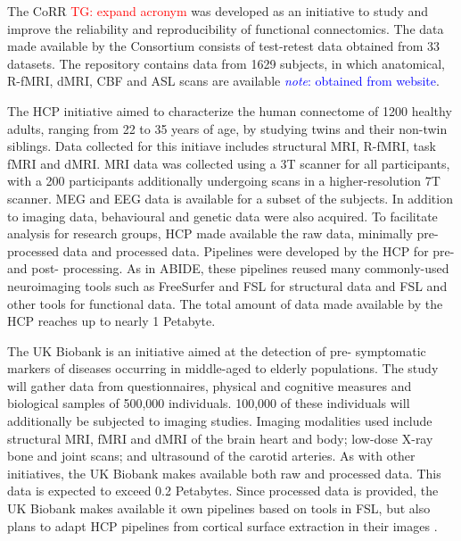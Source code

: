 \documentclass{report}
\newcommand{\note}[1]{\textcolor{blue}{\textit{note}: #1}}
\newcommand{\tristan}[1]{\textcolor{red}{TG: #1}}
\begin{document}
            The CoRR \tristan{expand acronym} was developed as an initiative to study and improve the 
            reliability and reproducibility of functional connectomics. The 
            data made available by the Consortium consists of test-retest data 
            obtained from 33 datasets. The repository contains data from 1629 
            subjects, in which anatomical, R-fMRI, dMRI, CBF and ASL scans are 
            available \note{obtained from website}.


            The HCP initiative aimed to characterize the human connectome of 
            1200 healthy adults, ranging from 22 to 35 years of age, by studying
            twins and their non-twin siblings. Data collected for this initiave
            includes structural MRI, R-fMRI, task fMRI and dMRI. MRI data was
            collected using a 3T scanner for all participants, with a 200 
            participants additionally undergoing scans in a higher-resolution 7T
            scanner. MEG and EEG data is available for a subset of the subjects. 
            In addition to imaging data, behavioural and genetic data were also 
            acquired. To facilitate analysis for research groups, HCP made 
            available the raw data, minimally pre-processed data and processed 
            data. Pipelines were developed by the HCP for pre- and post-
            processing. As in ABIDE, these pipelines reused many commonly-used
            neuroimaging tools such as FreeSurfer and FSL for structural data
            and FSL and other tools for functional data. The total amount of
            data made available by the HCP reaches up to nearly 1 Petabyte.


            The UK Biobank is an initiative aimed at the detection of pre-
            symptomatic markers of diseases occurring in middle-aged to elderly 
            populations. The study will gather data from questionnaires, 
            physical and cognitive measures and biological samples of 500,000
            individuals. 100,000 of these individuals will additionally be 
            subjected to imaging studies. Imaging modalities used include
            structural MRI, fMRI and dMRI of the brain heart and body; low-dose
            X-ray bone and joint scans; and ultrasound of the carotid arteries.
            As with other initiatives, the UK Biobank makes available both 
            raw and processed data. This data is expected to exceed 0.2 
            Petabytes. Since processed data is provided, the UK Biobank makes 
            available it own pipelines based on tools in FSL, but also plans to
            adapt HCP pipelines from cortical surface extraction in their images
            .
\end{document}
